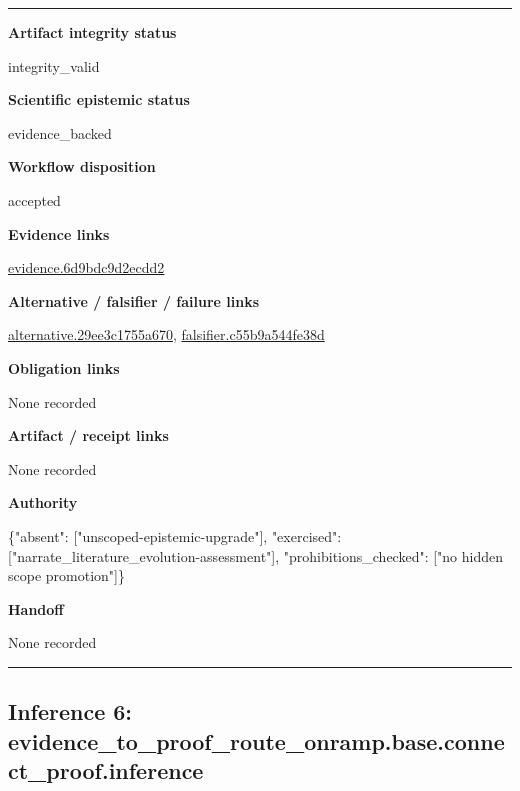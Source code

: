 \documentclass[10pt,a4paper]{article}
\newcommand{\TraceField}[2]{\par\noindent\textbf{#1}\par\noindent #2\par\smallskip}
\newenvironment{TraceDossier}{\par\medskip\noindent\hrule\medskip}{\medskip\hrule\par\medskip}
\begin{document}
\begin{TraceDossier}
\TraceField{Artifact integrity status}{integrity\_\allowbreak{}valid}

\TraceField{Scientific epistemic status}{evidence\_\allowbreak{}backed}

\TraceField{Workflow disposition}{accepted}

\TraceField{Evidence links}{\hyperlink{trace-evidence-94e53605c03275d98a}{evidence.\allowbreak{}6d9bdc9d2e\allowbreak{}cdd2}}

\TraceField{Alternative / falsifier / failure links}{\hyperlink{trace-alternative-240a5103e26f0c2f5c}{alternativ\allowbreak{}e.\allowbreak{}29ee3c1755\allowbreak{}a670}, \hyperlink{trace-alternative-04329ec021b956c507}{falsifier.\allowbreak{}c55b9a544f\allowbreak{}e38d}}

\TraceField{Obligation links}{None recorded}

\TraceField{Artifact / receipt links}{None recorded}

\TraceField{Authority}{\{"absent":\allowbreak{} ["unscoped\allowbreak{}-\allowbreak{}epistemic-\allowbreak{}upgrade"],\allowbreak{} "exercised\allowbreak{}":\allowbreak{} ["narrate\_\allowbreak{}literature\allowbreak{}\_\allowbreak{}evolution-\allowbreak{}assessment\allowbreak{}"], "prohibiti\allowbreak{}ons\_\allowbreak{}checked":\allowbreak{} ["no hidden scope promotion"\allowbreak{}]\}}

\TraceField{Handoff}{None recorded}

\end{TraceDossier}
\pagebreak[2]\subsection{Inference 6: evidence\_\allowbreak{}to\_\allowbreak{}proof\_\allowbreak{}route\_\allowbreak{}onramp.\allowbreak{}base.\allowbreak{}connect\_\allowbreak{}proof.\allowbreak{}inference}\label{trace-inference-57ac480fbe3167eb43}
\end{document}

